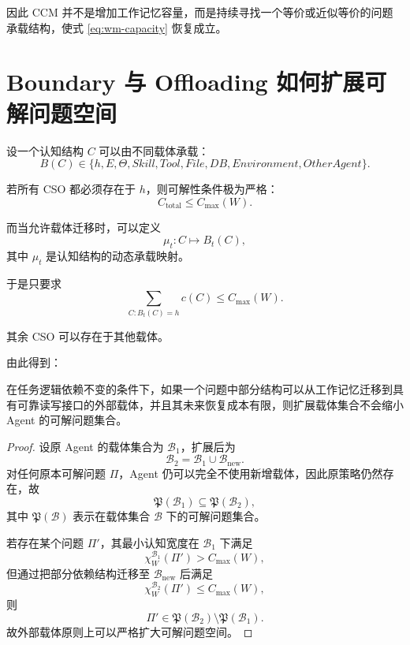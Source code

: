 因此 CCM 并不是增加工作记忆容量，而是持续寻找一个等价或近似等价的问题承载结构，使式 \eqref{eq:wm-capacity} 恢复成立。

\section{Boundary 与 Offloading 如何扩展可解问题空间}

设一个认知结构 $C$ 可以由不同载体承载：
\begin{equation}
B(C)
\in
\{
h,
E,
\Theta,
Skill,
Tool,
File,
DB,
Environment,
OtherAgent
\}.
\end{equation}

若所有 CSO 都必须存在于 $h$，则可解性条件极为严格：
\begin{equation}
C_{\mathrm{total}}
\leq
C_{\max}(W).
\end{equation}

而当允许载体迁移时，可以定义
\begin{equation}
\mu_t:
C
\mapsto
B_t(C),
\end{equation}
其中 $\mu_t$ 是认知结构的动态承载映射。

于是只要求
\begin{equation}
\sum_{C:B_t(C)=h}
c(C)
\leq
C_{\max}(W).
\end{equation}

其余 CSO 可以存在于其他载体。

由此得到：

\begin{theorem}[载体扩展定理]
在任务逻辑依赖不变的条件下，如果一个问题中部分结构可以从工作记忆迁移到具有可靠读写接口的外部载体，并且其未来恢复成本有限，则扩展载体集合不会缩小 Agent 的可解问题集合。
\end{theorem}

\begin{proof}
设原 Agent 的载体集合为 $\mathcal B_1$，扩展后为
\begin{equation}
\mathcal B_2
=
\mathcal B_1\cup\mathcal B_{\mathrm{new}}.
\end{equation}
对任何原本可解问题 $\Pi$，Agent 仍可以完全不使用新增载体，因此原策略仍然存在，故
\begin{equation}
\mathfrak P(\mathcal B_1)
\subseteq
\mathfrak P(\mathcal B_2),
\end{equation}
其中 $\mathfrak P(\mathcal B)$ 表示在载体集合 $\mathcal B$ 下的可解问题集合。

若存在某个问题 $\Pi'$，其最小认知宽度在 $\mathcal B_1$ 下满足
\begin{equation}
\chi_W^{\mathcal B_1}(\Pi')
>
C_{\max}(W),
\end{equation}
但通过把部分依赖结构迁移至 $\mathcal B_{\mathrm{new}}$ 后满足
\begin{equation}
\chi_W^{\mathcal B_2}(\Pi')
\leq
C_{\max}(W),
\end{equation}
则
\begin{equation}
\Pi'
\in
\mathfrak P(\mathcal B_2)
\setminus
\mathfrak P(\mathcal B_1).
\end{equation}
故外部载体原则上可以严格扩大可解问题空间。
\end{proof}

